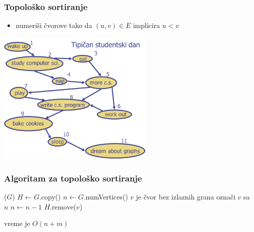 \documentclass[compress,aspectratio=169]{beamer}
\renewcommand{\algorithmiccomment}[1]{\hfill \{\myred{#1}\}}
\begin{document}
\begin{frame}[fragile]
  \frametitle{Topološko sortiranje}
  \begin{itemize}
    \item numeriši čvorove tako da $(u,v) \in E$ implicira $u<v$ 
  \end{itemize}
  \begin{center}
    \includegraphics[width=7.5cm]{asp-14-pic47.png}
  \end{center}
\end{frame}

\begin{frame}[fragile]
  \frametitle{Algoritam za topološko sortiranje}
  \begin{algorithmic}
    \STATE {}($G$)
    \STATE $H \leftarrow G$.copy()
    \STATE $n \leftarrow G$.numVertices()
      \STATE $v$ je čvor bez izlaznih grana
      \STATE označi $v$ sa $n$
      \STATE $n \leftarrow n-1$
      \STATE $H$.remove($v$)
    \ENDWHILE
  \end{algorithmic}
  \hfill vreme je $O(n+m)$
\end{frame}

\renewcommand{\algorithmiccomment}[1]{\{\myred{#1}\}}
\end{document}
